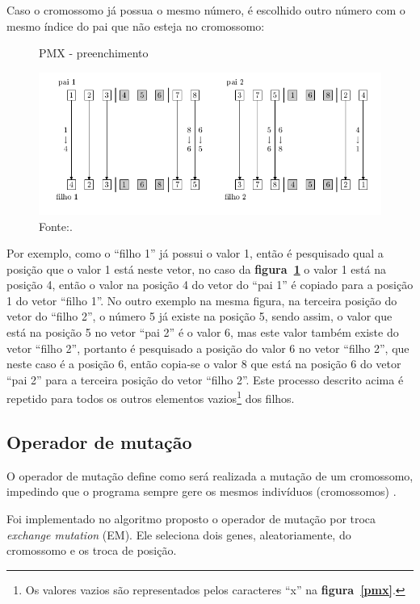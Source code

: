 \documentclass[12pt,openright,a4paper,twoside]{tcc}
\begin{document}
	   		Caso o cromossomo já possua o mesmo número, é escolhido outro número com o mesmo índice do pai que não esteja no cromossomo:
	   		\begin{figure}[h]
				\centering
                \caption{PMX - preenchimento}
		        \includegraphics[width = 14cm,keepaspectratio]{img/pmx2.png}		        
		        \caption*{Fonte:\cite{0012-pdf}.}
		        \label{pmx2}
	   		\end{figure}

	   		Por exemplo, como o ``filho 1'' já possui o valor 1, então é pesquisado qual a posição que o valor 1 está neste vetor, no caso da \textbf{figura~\ref{pmx2}} o valor 1 está na posição 4, então o valor na posição 4 do vetor do ``pai 1'' é copiado para a posição 1 do vetor ``filho 1''. No outro exemplo na mesma figura, na terceira posição do vetor do ``filho 2'',  o número 5 já existe na posição 5, sendo assim, o valor que está na posição 5 no vetor ``pai 2'' é o valor 6, mas este valor também existe do vetor ``filho 2'', portanto é pesquisado a posição do valor 6 no vetor ``filho 2'', que neste caso é a posição 6, então copia-se o valor 8 que está na posição 6 do vetor ``pai 2'' para a terceira posição do vetor ``filho 2''. 
	   		Este processo descrito acima é repetido para todos os outros elementos vazios\footnote{Os valores vazios são representados pelos caracteres ``x'' na \textbf{figura~\ref{pmx}}.} dos filhos.
	   		  
		\subsection{Operador de mutação}
			\label{Sem}
			O operador de mutação define como será realizada a mutação de um cromossomo, impedindo que o programa sempre gere os mesmos indivíduos (cromossomos) \cite{0012-pdf}.

			Foi implementado no algoritmo proposto o operador de mutação por troca \textit{exchange mutation} (EM). Ele seleciona dois genes, aleatoriamente, do cromossomo e os troca de posição.
\end{document}
